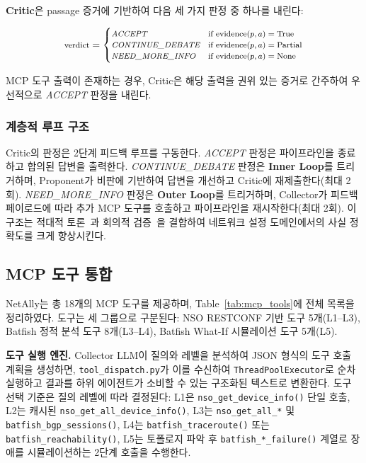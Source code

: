\textbf{Critic}은 passage 증거에 기반하여
다음 세 가지 판정 중 하나를 내린다:

\vspace{-8pt}
\begin{equation}
\footnotesize
  \text{verdict} =
  \begin{cases}
    \textit{ACCEPT}           & \text{if } \text{evidence}(p, a) = \text{True} \\
    \textit{CONTINUE\_DEBATE} & \text{if } \text{evidence}(p, a) = \text{Partial} \\
    \textit{NEED\_MORE\_INFO} & \text{if } \text{evidence}(p, a) = \text{None}
  \end{cases}
\end{equation}

MCP 도구 출력이 존재하는 경우,
Critic은 해당 출력을 권위 있는 증거로 간주하여
우선적으로 \textit{ACCEPT} 판정을 내린다.

\subsubsection{계층적 루프 구조}

Critic의 판정은 2단계 피드백 루프를 구동한다.
\textit{ACCEPT} 판정은 파이프라인을 종료하고 합의된 답변을 출력한다.
\textit{CONTINUE\_DEBATE} 판정은 \textbf{Inner Loop}를 트리거하며,
Proponent가 비판에 기반하여 답변을 개선하고
Critic에 재제출한다(최대 2회).
\textit{NEED\_MORE\_INFO} 판정은 \textbf{Outer Loop}를 트리거하며,
Collector가 피드백 페이로드에 따라 추가 MCP 도구를 호출하고
파이프라인을 재시작한다(최대 2회).
이 구조는 적대적 토론~\cite{du2024improving}과
회의적 검증~\cite{liang2024encouraging}을 결합하여
네트워크 설정 도메인에서의 사실 정확도를 크게 향상시킨다.

\subsection{MCP 도구 통합}

NetAlly는 총 18개의 MCP 도구를 제공하며,
Table~\ref{tab:mcp_tools}에 전체 목록을 정리하였다.
도구는 세 그룹으로 구분된다:
NSO RESTCONF 기반 도구 5개(L1--L3),
Batfish 정적 분석 도구 8개(L3--L4),
Batfish What-If 시뮬레이션 도구 5개(L5).

\textbf{도구 실행 엔진.}
Collector LLM이 질의와 레벨을 분석하여 JSON 형식의 도구 호출 계획을 생성하면,
\texttt{tool\_dispatch.py}가 이를 수신하여
\texttt{ThreadPoolExecutor}로 순차 실행하고
결과를 하위 에이전트가 소비할 수 있는 구조화된 텍스트로 변환한다.
도구 선택 기준은 질의 레벨에 따라 결정된다:
L1은 \texttt{nso\_get\_device\_info()} 단일 호출,
L2는 캐시된 \texttt{nso\_get\_all\_device\_info()},
L3는 \texttt{nso\_get\_all\_*} 및 \texttt{batfish\_bgp\_sessions()},
L4는 \texttt{batfish\_traceroute()} 또는 \texttt{batfish\_reachability()},
L5는 토폴로지 파악 후 \texttt{batfish\_*\_failure()} 계열로
장애를 시뮬레이션하는 2단계 호출을 수행한다.

